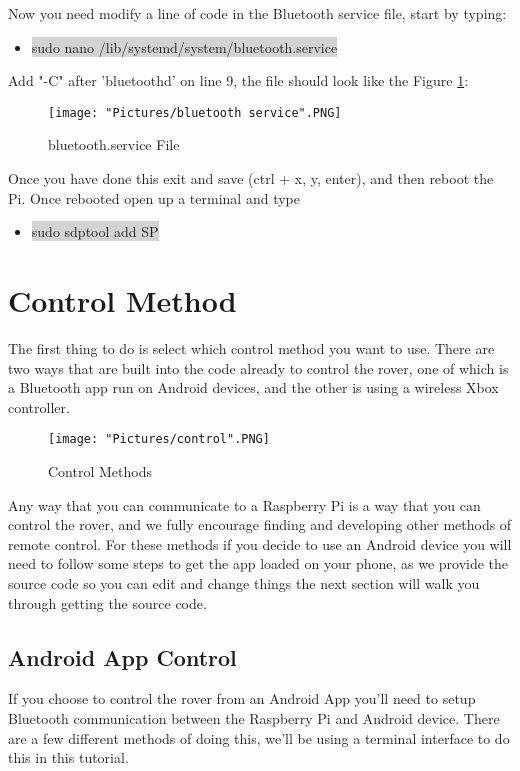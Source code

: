 \documentclass[12pt]{article}
\begin{document}
\noindent Now you need modify a line of code in the Bluetooth service file, start by typing:
\begin{itemize}
	\item[] \colorbox{lightgray}{sudo nano /lib/systemd/system/bluetooth.service}
\end{itemize}
\noindent Add "-C" after 'bluetoothd' on line 9, the file should look like the Figure \ref{bs}:

\begin{figure}[H]
 	\centering
	\texttt{[image: "Pictures/bluetooth service".PNG]}
	\caption{bluetooth.service File}
	\label{bs}
\end{figure}
	
\noindent Once you have done this exit and save (ctrl + x, y, enter), and then reboot the Pi. Once rebooted open up a terminal and type
\begin{itemize}
	\item[] \colorbox{lightgray}{sudo sdptool add SP}
\end{itemize}


\section{Control Method}

The first thing to do is select which control method you want to use. There are two ways that are built into the code already to control the rover, one of which is a Bluetooth app run on Android devices, and the other is using a wireless Xbox controller. 

\begin{figure}[H]
 	\centering
	\texttt{[image: "Pictures/control".PNG]}
 	\caption{Control Methods}
	\label{controls}
\end{figure}

\noindent Any way that you can communicate to a Raspberry Pi is a way that you can control the rover, and we fully encourage finding and developing other methods of remote control. For these methods if you decide to use an Android device you will need to follow some steps to get the app loaded on your phone, as we provide the source code so you can edit and change things the next section will walk you through getting the source code.

\subsection{Android App Control}
If you choose to control the rover from an Android App you'll need to setup Bluetooth communication between the Raspberry Pi and Android device. There are a few different methods of doing this, we'll be using a terminal interface to do this in this tutorial.
\end{document}
